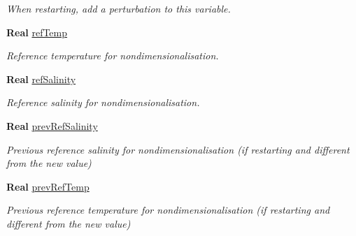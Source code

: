 \begin{DoxyCompactItemize}
\begin{DoxyCompactList}\small\item\em When restarting, add a perturbation to this variable. \end{DoxyCompactList}\item 
\mbox{\label{struct_mushy_layer_options_ad7e8fbd0d67ccca7cdaf2dfbed224f61}} 
\textbf{ Real} \hyperlink{struct_mushy_layer_options_ad7e8fbd0d67ccca7cdaf2dfbed224f61}{ref\+Temp}
\begin{DoxyCompactList}\small\item\em Reference temperature for nondimensionalisation. \end{DoxyCompactList}\item 
\mbox{\label{struct_mushy_layer_options_af8652850bc7203cb0b4f0664bfa46005}} 
\textbf{ Real} \hyperlink{struct_mushy_layer_options_af8652850bc7203cb0b4f0664bfa46005}{ref\+Salinity}
\begin{DoxyCompactList}\small\item\em Reference salinity for nondimensionalisation. \end{DoxyCompactList}\item 
\mbox{\label{struct_mushy_layer_options_aafe458cd1cefadcacebaed5507085f71}} 
\textbf{ Real} \hyperlink{struct_mushy_layer_options_aafe458cd1cefadcacebaed5507085f71}{prev\+Ref\+Salinity}
\begin{DoxyCompactList}\small\item\em Previous reference salinity for nondimensionalisation (if restarting and different from the new value) \end{DoxyCompactList}\item 
\mbox{\label{struct_mushy_layer_options_a75707a96ccd599b2750a80e99d2cf912}} 
\textbf{ Real} \hyperlink{struct_mushy_layer_options_a75707a96ccd599b2750a80e99d2cf912}{prev\+Ref\+Temp}
\begin{DoxyCompactList}\small\item\em Previous reference temperature for nondimensionalisation (if restarting and different from the new value) \end{DoxyCompactList}\item 
\mbox{\label{struct_mushy_layer_options_a7f427164689a4cbf14082bad6bbcf888}} 

\end{DoxyCompactItemize}
